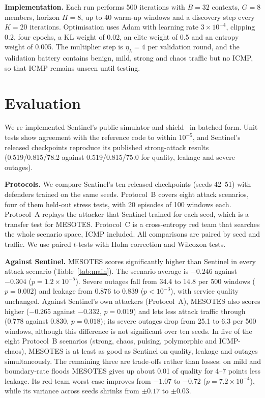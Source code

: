 \documentclass[journal]{IEEEtran}
\begin{document}
\textbf{Implementation.} Each run performs 500 iterations with $B=32$ contexts, $G=8$ members, horizon $H=8$, up to 40 warm-up windows and a discovery step every $K=20$ iterations. Optimisation uses Adam with learning rate $3\times10^{-4}$, clipping 0.2, four epochs, a KL weight of 0.02, an elite weight of 0.5 and an entropy weight of 0.005. The multiplier step is $\eta_\lambda=4$ per validation round, and the validation battery contains benign, mild, strong and chaos traffic but no ICMP, so that ICMP remains unseen until testing.

\section{Evaluation}
\label{sec:eval}
We re-implemented Sentinel's public simulator and shield~\cite{sentinelcode} in batched form. Unit tests show agreement with the reference code to within $10^{-5}$, and Sentinel's released checkpoints reproduce its published strong-attack results (0.519/0.815/78.2 against 0.519/0.815/75.0 for quality, leakage and severe outages).

\textbf{Protocols.} We compare Sentinel's ten released checkpoints (seeds 42--51) with defenders trained on the same seeds. Protocol~B covers eight attack scenarios, four of them held-out stress tests, with 20 episodes of 100 windows each. Protocol~A replays the attacker that Sentinel trained for each seed, which is a transfer test for MESOTES. Protocol~C is a cross-entropy red team that searches the whole scenario space, ICMP included. All comparisons are paired by seed and traffic. We use paired $t$-tests with Holm correction and Wilcoxon tests.



\textbf{Against Sentinel.} MESOTES scores significantly higher than Sentinel in every attack scenario (Table~\ref{tab:main}). The scenario average is $-0.246$ against $-0.304$ ($p=1.2\times10^{-5}$). Severe outages fall from 34.4 to 14.8 per 500 windows ($p=0.002$) and leakage from 0.876 to 0.839 ($p<10^{-3}$), with service quality unchanged. Against Sentinel's own attackers (Protocol~A), MESOTES also scores higher ($-0.265$ against $-0.332$, $p=0.019$) and lets less attack traffic through (0.778 against 0.830, $p=0.018$); its severe outages drop from 25.1 to 6.3 per 500 windows, although this difference is not significant over ten seeds. In five of the eight Protocol~B scenarios (strong, chaos, pulsing, polymorphic and ICMP-chaos), MESOTES is at least as good as Sentinel on quality, leakage and outages simultaneously. The remaining three are trade-offs rather than losses: on mild and boundary-rate floods MESOTES gives up about 0.01 of quality for 4--7 points less leakage. Its red-team worst case improves from $-1.07$ to $-0.72$ ($p=7.2\times10^{-4}$), while its variance across seeds shrinks from $\pm0.17$ to $\pm0.03$.
\end{document}
